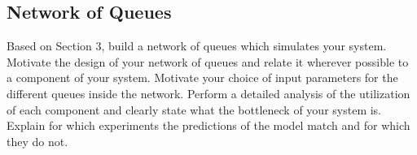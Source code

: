 \documentclass[11pt,a4paper]{article}
\begin{document}
\subsection{Network of Queues}

Based on Section 3, build a network of queues which simulates your system. Motivate the design of your network of queues and relate it wherever possible to a component of your system. Motivate your choice of input parameters for the different queues inside the network. Perform a detailed analysis of the utilization of each component and clearly state what the bottleneck of your system is. Explain for which experiments the predictions of the model match and for which they do not.
\end{document}

